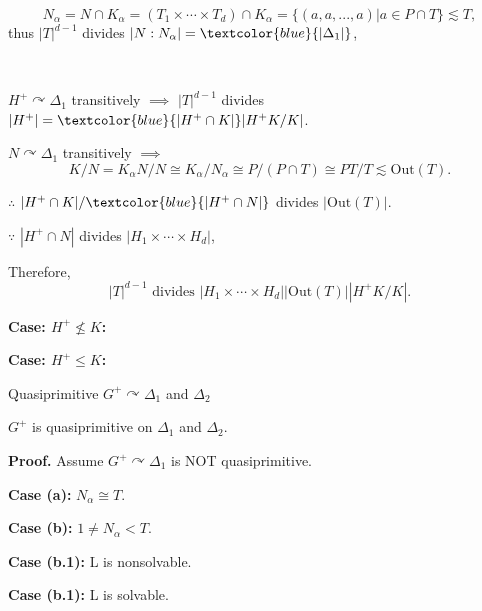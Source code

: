 \documentclass{beamer}
\def\Out{\mathrm{Out}}
\begin{document}
\begin{frame}
\[N_\alpha=N\cap K_\alpha=(T_1\times\cdots\times T_d)\cap K_\alpha=\{(a,a,...,a)|a\in P\cap T\}\lesssim T,\]
thus $|T|^{d-1}$ divides $|N:N_\alpha|=\textcolor{blue}{|\Delta_1|}$, 

\ 

$H^+\curvearrowright\Delta_1$ transitively $\implies$ $|T|^{d-1}$ divides $|H^+|=\textcolor{blue}{|H^+\cap K|}|H^+K/K|$.

$N\curvearrowright \Delta_1$ transitively $\implies$ \[K/N=K_\alpha N/N\cong K_\alpha/N_\alpha\cong P/(P\cap T)\cong PT/T\lesssim \Out(T).\]

$\therefore$ $|H^+\cap K|/\textcolor{blue}{|H^+\cap N|}$ divides $|\Out(T)|$.

$\because$ $|H^+\cap N|$ divides $|H_1\times\cdots\times H_d|$,

Therefore, \[|T|^{d-1}\text{ divides }|H_1\times\cdots\times H_d||\Out(T)||H^+K/K|.\]
\end{frame}


\begin{frame}
\textbf{Case: $H^+\not\leq K$: }


\end{frame}

\begin{frame}
\textbf{Case: $H^+\leq K$: }


\end{frame}




\begin{frame}{Quasiprimitive $G^+\curvearrowright \Delta_1$ and $\Delta_2$} 
\begin{lemma}[4.6]
$G^+$ is quasiprimitive on $\Delta_1$ and $\Delta_2$.
\end{lemma}
\textbf{Proof. } Assume $G^+\curvearrowright\Delta_1$ is NOT quasiprimitive.
\end{frame}

\begin{frame}
\textbf{Case (a): } $N_\alpha\cong T$.
\end{frame}


\begin{frame}
\textbf{Case (b): } $1\neq N_\alpha< T$.
\end{frame}

\begin{frame}
\textbf{Case (b.1): } L is nonsolvable.
\end{frame}

\begin{frame}
\textbf{Case (b.1): } L is solvable.
\end{frame}
\end{document}
